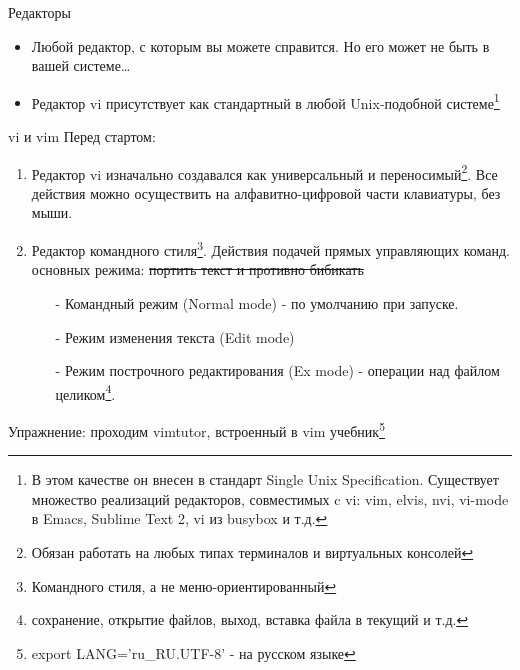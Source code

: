  \begin{frame}{Редакторы}

  \begin{itemize}
    \item Любой редактор, с которым вы можете справится. \pause Но его может не быть в вашей системе\ldots \pause
    \item Редактор \alert{vi} присутствует как стандартный в любой Unix-подобной системе\footnote{В этом качестве он внесен в стандарт Single Unix Specification. Существует множество реализаций редакторов, совместимых c vi: vim, elvis, nvi, vi-mode в Emacs, Sublime Text 2, vi из busybox и т.д.} \pause
  \end{itemize}

\end{frame}

\begin{frame}{vi и vim}
  Перед стартом:

  \begin{enumerate}
    \item  Редактор vi изначально создавался как универсальный и переносимый\footnote{Обязан работать на любых типах терминалов и виртуальных консолей}. Все действия можно осуществить на алфавитно-цифровой части клавиатуры, без мыши. \pause
    \item \alert{Редактор командного стиля}\footnote{Командного стиля, а не меню-ориентированный}. Действия подачей прямых управляющих команд. \pause {} основных режима: \sout{портить текст и противно бибикать}
      \begin{itemize}
        \item[-] \alert{Командный режим} (Normal mode) - по умолчанию при запуске.
        \item[-] \alert{Режим изменения текста} (Edit mode)
        \item[-] \alert{Режим построчного редактирования} (Ex mode) - операции над файлом целиком\footnote{сохранение, открытие файлов, выход, вставка файла в текущий и т.д.}.
      \end{itemize}
  \end{enumerate} \pause
  \alert{Упражнение}: проходим \alert{vimtutor}, встроенный в vim учебник\footnote{ export LANG='ru\_RU.UTF-8' - на русском языке }
\end{frame}

